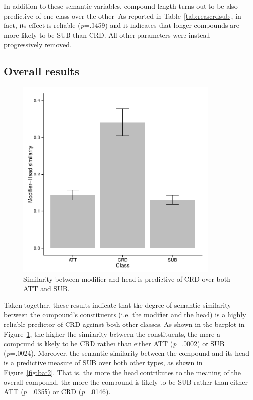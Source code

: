 \documentclass[output=paper]{langsci/langscibook}
\begin{document}
In addition to these semantic variables, compound length turns out to be also predictive of one class over the other. As reported in Table~\ref{tab:reascrdsub}, in fact, its effect is reliable (\emph{p}=.0459) and it indicates that longer compounds are more likely to be SUB than CRD. All other parameters were instead progressively removed.

\subsection{Overall results}

\begin{figure}[t!]
\begin{center}
\includegraphics[width=10cm]{figures/barplot1.pdf}
\caption{Similarity between modifier and head is predictive of CRD over both ATT and SUB.}\label{fig:bar1}
\end{center}
\end{figure}


Taken together, these results indicate that the degree of semantic similarity between the compound's constituents (i.e. the modifier and the head) is a highly reliable predictor of CRD against both other classes. As shown in the barplot in Figure~\ref{fig:bar1}, the higher the similarity between the constituents, the more a compound is likely to be CRD rather than either ATT (\emph{p}=.0002) or SUB (\emph{p}=.0024). Moreover, the semantic similarity between the compound and its head is a predictive measure of SUB over both other types, as shown in Figure~\ref{fig:bar2}. That is, the more the head contributes to the meaning of the overall compound, the more the compound is likely to be SUB rather than either ATT (\emph{p}=.0355) or CRD (\emph{p}=.0146).
\end{document}
